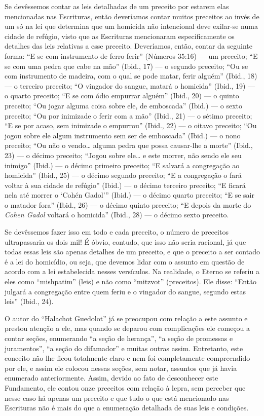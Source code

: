 Se devêssemos contar as leis detalhadas de um preceito por estarem elas
mencionadas nas Escrituras, então deveríamos contar muitos preceitos ao
invés de um só na lei que determina que um homicida não intencional deve
exilar-se numa cidade de refúgio, visto que as Escrituras mencionaram
especificamente os detalhes das leis relativas a esse preceito.
Deveríamos, então, contar da seguinte forma: ``E se com instrumento de
ferro ferir'' (Números 35:16) --- um preceito; ``E se com uma pedra que
cabe na mão'' (Ibid., 17) --- o segundo preceito; ``Ou se com
instrumento de madeira, com o qual se pode matar, ferir alguém'' (Ibid.,
18) --- o terceiro preceito; ``O vingador do sangue, matará o homicida''
(Ibid., 19) --- o quarto preceito; ``E se com ódio empurrar alguém''
(Ibid., 20) --- o quinto preceito; ``Ou jogar alguma coisa sobre ele, de
emboscada'' (Ibid.) --- o sexto preceito; ``Ou por inimizade o ferir
com a mão'' (Ibid., 21) --- o sétimo preceito; ``E se por acaso, sem inimizade o empurrou'' (Ibid., 22) --- o oitavo preceito; ``Ou jogou sobre ele algum instrumento sem ser  de emboscada'' (Ibid.) --- o nono preceito; ``Ou não o vendo\ldots{} alguma
  pedra que possa causar-lhe a morte'' (Ibid., 23) --- o décimo
  preceito; ``Jogou sobre ele\ldots{} e este morrer, não sendo ele seu
  inimigo'' (Ibid.) --- o décimo primeiro preceito; ``E salvará a
  congregação ao homicida'' (Ibid., 25) --- o décimo segundo preceito;
  ``E a congregação o fará voltar à sua cidade de refúgio'' (Ibid.) ---
  o décimo terceiro preceito; ``E ficará nela até morrer o `Cohén
  Gadol''' (Ibid.) --- o décimo quarto preceito; ``E se sair o matador fora'' (Ibid., 26) --- o décimo quinto preceito; ``E depois da morte do \textit{Cohen Gadol} voltará o
homicida'' (Ibid., 28) --- o décimo sexto preceito.

Se devêssemos fazer isso em todo e cada preceito, o número de preceitos
ultrapassaria os dois mil! É óbvio, contudo, que isso não seria
racional, já que todas essas leis são apenas detalhes de um preceito, e
que o preceito a ser contado é a lei do homicídio, ou seja, que devemos
lidar com o assunto em questão de acordo com a lei estabelecida nesses
versículos. Na realidade, o Eterno se referiu a eles como ``mishpatim''
(leis) e não como ``mitzvot'' (preceitos). Ele disse: ``Então julgará a
congregação entre quem feriu e o vingador do sangue, segundo estas
leis'' (Ibid., 24).

O autor do ``Halachot Guedolot'' já se preocupou com relação a este
assunto e prestou atenção a ele, mas quando se deparou com complicações
ele começou a contar seções, enumerando ``a seção de herança'', ``a
seção de promessas e juramentos'', ``a seção do difamador'' e muitas
outras assim. Entretanto, este conceito não lhe ficou totalmente claro
e nem foi completamente compreendido por ele, e assim ele colocou
nessas seções, sem notar, assuntos que já havia enumerado
anteriormente. Assim, devido ao fato de desconhecer este Fundamento,
ele contou onze preceitos com relação à lepra, sem perceber que nesse
caso há apenas um preceito e que tudo o que está mencionado nas
Escrituras não é mais do que a enumeração detalhada de suas leis e
condições.


